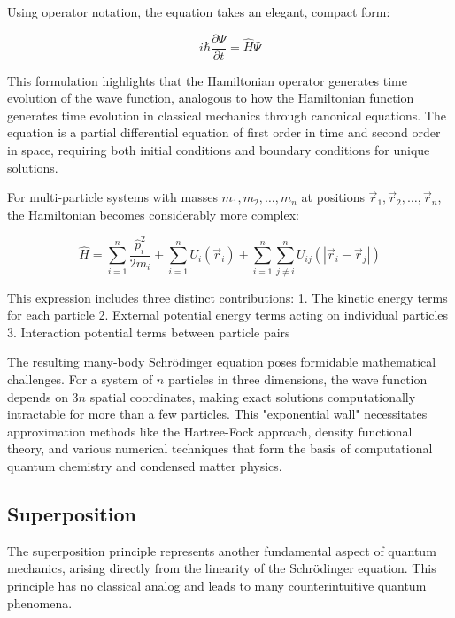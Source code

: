 \documentclass[italian]{HKNdocument}
\begin{document}
Using operator notation, the equation takes an elegant, compact form:

\begin{equation}
i \hbar \frac{\partial \Psi}{\partial t}=\hat{H} \Psi
\end{equation}

This formulation highlights that the Hamiltonian operator generates time evolution of the wave function, analogous to how the Hamiltonian function generates time evolution in classical mechanics through canonical equations. The equation is a partial differential equation of first order in time and second order in space, requiring both initial conditions and boundary conditions for unique solutions.

For multi-particle systems with masses $m_{1}, m_{2}, \ldots, m_{n}$ at positions $\vec{r}_{1}, \vec{r}_{2}, \ldots, \vec{r}_{n}$, the Hamiltonian becomes considerably more complex:

\begin{equation}
\hat{H}=\sum_{i=1}^{n} \frac{\hat{p}_i^{2}}{2 m_{i}}+\sum_{i=1}^{n} U_{i}\left(\vec{r}_{i}\right)+\sum_{i=1}^{n} \sum_{j \neq i}^{n} U_{i j}\left(\left|\vec{r}_{i}-\vec{r}_{j}\right|\right)
\end{equation}

This expression includes three distinct contributions:
1. The kinetic energy terms for each particle
2. External potential energy terms acting on individual particles
3. Interaction potential terms between particle pairs

The resulting many-body Schrödinger equation poses formidable mathematical challenges. For a system of $n$ particles in three dimensions, the wave function depends on $3n$ spatial coordinates, making exact solutions computationally intractable for more than a few particles. This "exponential wall" necessitates approximation methods like the Hartree-Fock approach, density functional theory, and various numerical techniques that form the basis of computational quantum chemistry and condensed matter physics.

\subsection{Superposition}
The superposition principle represents another fundamental aspect of quantum mechanics, arising directly from the linearity of the Schrödinger equation. This principle has no classical analog and leads to many counterintuitive quantum phenomena.
\end{document}
